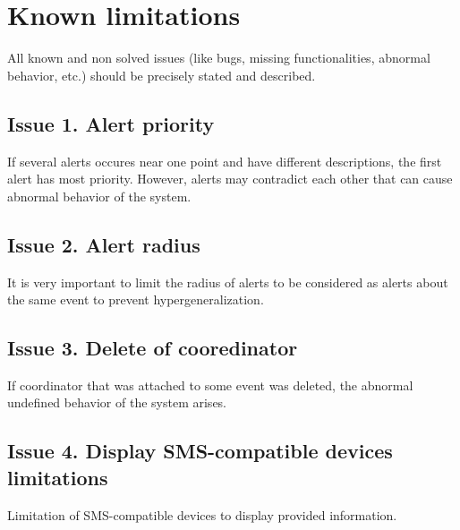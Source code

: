 \chapter{Known limitations}
\label{chap:know_limitations}


All known and non solved issues (like bugs, missing functionalities, abnormal
behavior, etc.) should be precisely stated and described.


\section{Issue 1. Alert priority}
If several alerts occures near one point and have different descriptions, the
first alert has most priority. However, alerts may contradict each other that
can cause abnormal behavior of the system.

\section{Issue 2. Alert radius}
It is very important to limit the radius of alerts to be considered as alerts
about the same event to prevent hypergeneralization.

\section{Issue 3. Delete of cooredinator}
If coordinator that was attached to some event was deleted, the abnormal
undefined behavior of the system arises.

\section{Issue 4. Display SMS-compatible devices limitations}
Limitation of SMS-compatible devices to display provided information.
